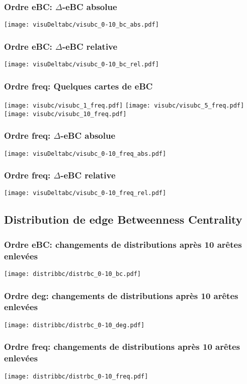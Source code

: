 \documentclass[aspectratio=169]{beamer}
\begin{document}
    \begin{frame}
        \centering
        \frametitle{Ordre eBC: $\Delta$-eBC absolue}
        \texttt{[image: visuDeltabc/visubc\_0-10\_bc\_abs.pdf]}
    \end{frame}

    \begin{frame}
        \centering
        \frametitle{Ordre eBC: $\Delta$-eBC relative}
        \texttt{[image: visuDeltabc/visubc\_0-10\_bc\_rel.pdf]}
    \end{frame}
    
    \begin{frame}
        \frametitle{Ordre freq: Quelques cartes de eBC}
        \texttt{[image: visubc/visubc\_1\_freq.pdf]}
        \texttt{[image: visubc/visubc\_5\_freq.pdf]}
        \texttt{[image: visubc/visubc\_10\_freq.pdf]}
    \end{frame}

    \begin{frame}
        \centering
        \frametitle{Ordre freq: $\Delta$-eBC absolue}
        \texttt{[image: visuDeltabc/visubc\_0-10\_freq\_abs.pdf]}
    \end{frame}

    \begin{frame}
        \centering
        \frametitle{Ordre freq: $\Delta$-eBC relative}
        \texttt{[image: visuDeltabc/visubc\_0-10\_freq\_rel.pdf]}
    \end{frame}
    
    \subsection{Distribution de edge Betweenness Centrality}
    \begin{frame}
        \frametitle{Ordre eBC: changements de distributions après 10 arêtes enlevées}
        \centering
        \texttt{[image: distribbc/distrbc\_0-10\_bc.pdf]}    
    \end{frame}

    \begin{frame}
        \frametitle{Ordre deg: changements de distributions après 10 arêtes enlevées}
        \centering
        \texttt{[image: distribbc/distrbc\_0-10\_deg.pdf]}    
    \end{frame}

    \begin{frame}
        \frametitle{Ordre freq: changements de distributions après 10 arêtes enlevées}
        \centering
        \texttt{[image: distribbc/distrbc\_0-10\_freq.pdf]}    
    \end{frame}
\end{document}
